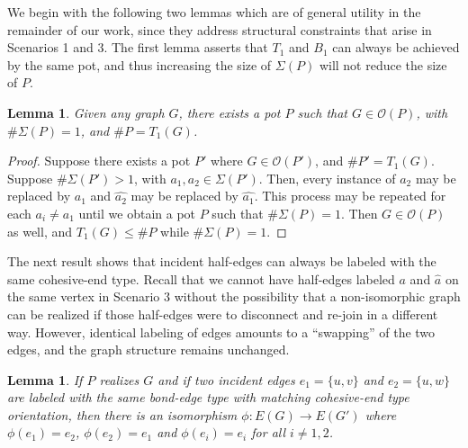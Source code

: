 \documentclass{elsarticle}
\newtheorem{lemma}[theorem]{Lemma}
\theoremstyle{definition}
\theoremstyle{remark}
\theoremstyle{plain}
\theoremstyle{plain}
\begin{document}


 We begin with the  following two lemmas which are of general utility in the remainder of our work, since they address structural constraints that arise in Scenarios 1 and 3. The first lemma asserts that $T_1$ and $B_1$ can always be achieved by the same pot, and thus  increasing the size of $\Sigma(P)$ will not reduce the size of $P$.
 
\begin{lemma}\label{onebondlemma}
Given any graph $G$, there exists a pot $P$ such that $G \in \mathcal{O}(P)$, with $\# \Sigma(P) = 1$, and $\#P = T_1(G)$. 
\end{lemma}

\begin{proof}
 Suppose there exists a pot $P'$ where $G \in \mathcal{O}(P')$, and $\# P' = T_1(G)$.  Suppose $\#\Sigma(P')>1$, with $a_1, a_2 \in \Sigma(P')$. Then, every instance of $a_2$ may be replaced by $a_1$ and $\widehat{a_2}$ may be replaced by $\widehat{a_1}$. This process may be repeated for each $a_i \neq a_1$ until we obtain a pot $P$ such that $\# \Sigma (P) =1$. Then $G \in \mathcal{O}(P)$ as well, and $T_1(G) \leq \#P$ while $\# \Sigma (P) = 1$.  
\end{proof}

 The next result shows that incident half-edges can always be labeled with the  same cohesive-end type.  Recall that we cannot have half-edges labeled $a$ and $\hat{a}$ on the same vertex in Scenario 3 without the possibility that a non-isomorphic graph can be realized if those half-edges were to disconnect and re-join in a different way. However, identical labeling of edges amounts to a ``swapping'' of the two edges, and the graph structure remains unchanged. 

\begin{lemma}\label{lemma:edgeswap}
 If $P$ realizes $G$ and if two incident edges $e_1=\{u,v\}$ and $e_2=\{u,w\}$ are labeled with the same bond-edge type with matching cohesive-end type orientation, then there is an isomorphism $\phi: E(G) \to E(G')$ where $\phi(e_1) = e_2$, $\phi(e_2) = e_1$ and $\phi(e_i) = e_i$ for all $i \neq 1,2$.
\end{lemma}
\end{document}
